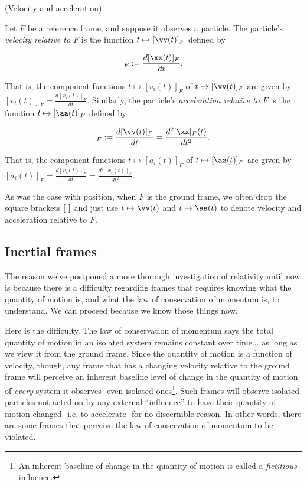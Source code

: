 \documentclass{article}
\begin{document}
\begin{defn}
	(Velocity and acceleration).
	
	Let $F$ be a reference frame, and suppose it observes a particle. The particle's \textit{velocity relative to $F$} is the function $t \mapsto [\vv(t)]_F$ defined by
	
	\begin{align*}
		[\vv(t)]_F := \frac{d[\xx(t)]_F}{dt}.
	\end{align*}
	
	That is, the component functions $t \mapsto [v_i(t)]_F$ of $t \mapsto [\vv(t)]_F$ are given by $[v_i(t)]_F = \frac{d[x_i(t)]_F}{dt}$. Similarly, the particle's \textit{acceleration relative to $F$} is the function $t \mapsto [\aa(t)]_F$ defined by
	
	\begin{align*}
		[\aa(t)]_F := \frac{d[\vv(t)]_F}{dt} = \frac{d^2[\xx]_F(t)}{dt^2}.
	\end{align*}
	
	That is, the component functions $t \mapsto [a_i(t)]_F$ of $t \mapsto [\aa(t)]_F$ are given by $[a_i(t)]_F = \frac{d[v_i(t)]_F}{dt} = \frac{d^2[x_i(t)]_F}{dt^2}$.
	
	As was the case with position, when $F$ is the ground frame, we often drop the square brackets $[\text{ }]$ and just use $t \mapsto \vv(t)$ and $t \mapsto \aa(t)$ to denote velocity and acceleration relative to $F$.
\end{defn}

\subsection*{Inertial frames}

The reason we've postponed a more thorough investigation of relativity until now is because there is a difficulty regarding frames that requires knowing what the quantity of motion is, and what the law of conservation of momentum is, to understand. We can proceed because we know those things now.

Here is the difficulty. The law of conservation of momentum says the total quantity of motion in an isolated system remains constant over time... as long as we view it from the ground frame. Since the quantity of motion is a function of velocity, though, any frame that has a changing velocity relative to the ground frame will perceive an inherent baseline level of change in the quantity of motion of \textit{every} system it observes- even isolated ones\footnote{An inherent baseline of change in the quantity of motion is called a \textit{fictitious} influence.}. Such frames will observe isolated particles not acted on by any external ``influence'' to have their quantity of motion changed- i.e. to accelerate- for no discernible reason. In other words, there are some frames that perceive the law of conservation of momentum to be violated.
\end{document}
